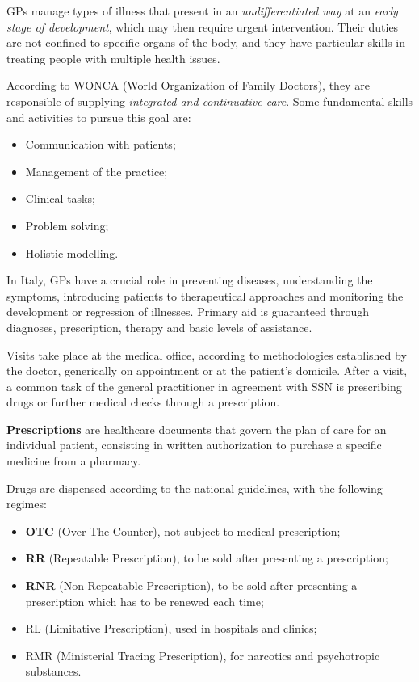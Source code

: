 GPs manage types of illness that present in an \textit{undifferentiated way} at an \textit{early stage of development}, which may then require urgent intervention. Their duties are not confined to specific organs of the body, and they have particular skills in treating people with multiple health issues\cite{wonca2}. 

According to WONCA (World Organization of Family Doctors), they are responsible of supplying \textit{integrated and continuative care}. Some fundamental skills and activities\cite{wonca2} to pursue this goal are:
\begin{itemize}
	\item Communication with patients;
	\item Management of the practice;
	\item Clinical tasks;
	\item Problem solving;
	\item Holistic modelling.
\end{itemize}

In Italy, GPs have a crucial role in preventing diseases, understanding the symptoms, introducing patients to therapeutical approaches and monitoring the development or regression of illnesses\cite{gp}. Primary aid is guaranteed through diagnoses, prescription, therapy and basic levels of assistance.

Visits take place at the medical office, according to methodologies established by the doctor, generically on appointment or at the patient's domicile. After a visit, a common task of the general practitioner in agreement with SSN is prescribing drugs or further medical checks through a prescription.

\textbf{Prescriptions} are healthcare documents that govern the plan of care for an individual patient\cite{ascpt}, consisting in written authorization to purchase a specific medicine from a pharmacy.

Drugs are dispensed according to the national guidelines, with the following regimes:
\begin{itemize}
	\item \textbf{OTC} (Over The Counter), not subject to medical prescription;
	\item \textbf{RR} (Repeatable Prescription), to be sold after presenting a prescription;
	\item \textbf{RNR} (Non-Repeatable Prescription), to be sold after presenting a prescription which has to be renewed each time;
	\item RL (Limitative Prescription), used in hospitals and clinics;
	\item RMR (Ministerial Tracing Prescription), for narcotics and psychotropic substances.
\end{itemize}

